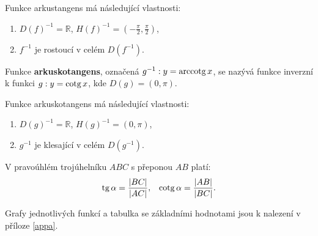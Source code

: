 \begin{pozn}
Funkce arkustangens má následující vlastnosti:
\begin{enumerate}
\item $D(f)^{-1} = \mathbb{R}$, $H(f)^{-1} = \left ( -\frac{\pi}{2}, \frac{\pi}{2} \right )$,
\item $f^{-1}$ je rostoucí v celém $D(f^{-1})$.
\end{enumerate}
\end{pozn}

\begin{definition}[Arkuskotangens]
  Funkce \textbf{arkuskotangens}, označená $g^{-1}: y=\operatorname{arccotg} x$, se nazývá funkce inverzní k funkci $g: y=\operatorname{cotg} x$, kde $D(g)=\left ( 0, \pi \right )$.
\end{definition}

\begin{pozn}
Funkce arkuskotangens má následující vlastnosti:
\begin{enumerate}
\item $D(g)^{-1} = \mathbb{R}$, $H(g)^{-1} = \left ( 0, \pi \right )$,
\item $g^{-1}$ je klesající v celém $D(g^{-1})$.
\end{enumerate}
\end{pozn}

\begin{veta}
    V pravoúhlém trojúhelníku $ABC$ s přeponou $AB$ platí:
    \begin{align*}
        \operatorname{tg} \alpha = \frac{ |BC| }{ |AC| }, & & \operatorname{cotg} \alpha = \frac{|AB|}{|BC|}.
    \end{align*}
\end{veta}

\begin{pozn}
    Grafy jednotlivých funkcí a tabulka se základními hodnotami jsou k nalezení
    v příloze \ref{appa}.
\end{pozn}

